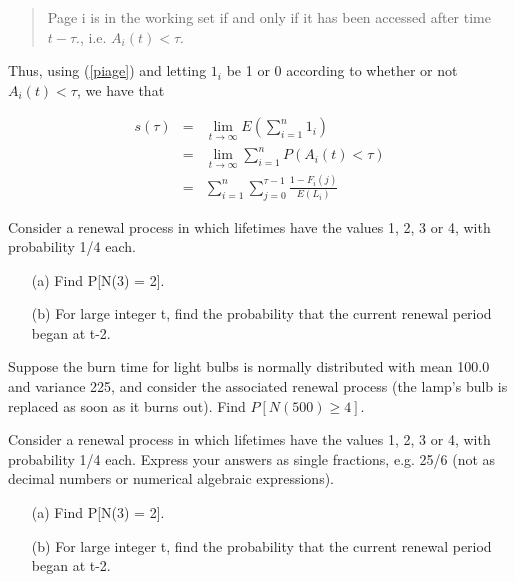 \begin{quote}
Page i is in the working set if and only if it has been accessed 
after time $t-\tau $., i.e. $A_{i}(t)<\tau $.  
\end{quote}

Thus, using (\ref{piage}) and letting $1_{i}$ be 1 or 0 according to
whether or not $A_{i}(t)<\tau $, we have that

\begin{eqnarray}
s(\tau ) & = & \lim_{t\rightarrow \infty } E(\sum ^{n}_{i=1}1_{i})
\nonumber \\
 & = & \lim_{t\rightarrow \infty } \sum ^{n}_{i=1}P(A_{i}(t)<\tau )
 \nonumber \\
 & = & \sum ^{n}_{i=1}\sum ^{\tau -1}_{j=0}\frac{1-F_{i}(j)}{E(L_{i})}
\end{eqnarray}

\startproblemset

\oneproblem
Consider a renewal process in which lifetimes have the values
1, 2, 3 or 4, with probability 1/4 each.

\begin{itemize}

\item [(a)] Find P[N(3) = 2].

\item [(b)] For large integer t, find the probability that the current
renewal period began at t-2.

\end{itemize}

\oneproblem
Suppose the burn time for light bulbs is normally distributed with 
mean 100.0 and variance 225, and consider the associated renewal 
process (the lamp's bulb is replaced as soon as it burns out). Find 
$P[ N(500) \geq 4]$.  

\oneproblem
Consider a renewal process in which lifetimes have the values
1, 2, 3 or 4, with probability 1/4 each.  Express your answers as single
fractions, e.g. 25/6 (not as decimal numbers or numerical algebraic
expressions).

\begin{itemize}

\item [(a)] Find P[N(3) = 2].

\item [(b)] For large integer t, find the probability that the current
renewal period began at t-2.


\end{itemize}


